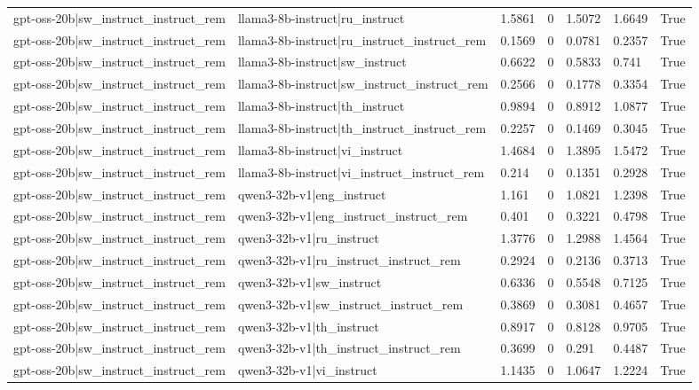 \begin{table}
\begin{tabular}{llllllr}
gpt-oss-20b|sw_instruct_instruct_rem & llama3-8b-instruct|ru_instruct & 1.5861 & 0 & 1.5072 & 1.6649 & True \\
gpt-oss-20b|sw_instruct_instruct_rem & llama3-8b-instruct|ru_instruct_instruct_rem & 0.1569 & 0 & 0.0781 & 0.2357 & True \\
gpt-oss-20b|sw_instruct_instruct_rem & llama3-8b-instruct|sw_instruct & 0.6622 & 0 & 0.5833 & 0.741 & True \\
gpt-oss-20b|sw_instruct_instruct_rem & llama3-8b-instruct|sw_instruct_instruct_rem & 0.2566 & 0 & 0.1778 & 0.3354 & True \\
gpt-oss-20b|sw_instruct_instruct_rem & llama3-8b-instruct|th_instruct & 0.9894 & 0 & 0.8912 & 1.0877 & True \\
gpt-oss-20b|sw_instruct_instruct_rem & llama3-8b-instruct|th_instruct_instruct_rem & 0.2257 & 0 & 0.1469 & 0.3045 & True \\
gpt-oss-20b|sw_instruct_instruct_rem & llama3-8b-instruct|vi_instruct & 1.4684 & 0 & 1.3895 & 1.5472 & True \\
gpt-oss-20b|sw_instruct_instruct_rem & llama3-8b-instruct|vi_instruct_instruct_rem & 0.214 & 0 & 0.1351 & 0.2928 & True \\
gpt-oss-20b|sw_instruct_instruct_rem & qwen3-32b-v1|eng_instruct & 1.161 & 0 & 1.0821 & 1.2398 & True \\
gpt-oss-20b|sw_instruct_instruct_rem & qwen3-32b-v1|eng_instruct_instruct_rem & 0.401 & 0 & 0.3221 & 0.4798 & True \\
gpt-oss-20b|sw_instruct_instruct_rem & qwen3-32b-v1|ru_instruct & 1.3776 & 0 & 1.2988 & 1.4564 & True \\
gpt-oss-20b|sw_instruct_instruct_rem & qwen3-32b-v1|ru_instruct_instruct_rem & 0.2924 & 0 & 0.2136 & 0.3713 & True \\
gpt-oss-20b|sw_instruct_instruct_rem & qwen3-32b-v1|sw_instruct & 0.6336 & 0 & 0.5548 & 0.7125 & True \\
gpt-oss-20b|sw_instruct_instruct_rem & qwen3-32b-v1|sw_instruct_instruct_rem & 0.3869 & 0 & 0.3081 & 0.4657 & True \\
gpt-oss-20b|sw_instruct_instruct_rem & qwen3-32b-v1|th_instruct & 0.8917 & 0 & 0.8128 & 0.9705 & True \\
gpt-oss-20b|sw_instruct_instruct_rem & qwen3-32b-v1|th_instruct_instruct_rem & 0.3699 & 0 & 0.291 & 0.4487 & True \\
gpt-oss-20b|sw_instruct_instruct_rem & qwen3-32b-v1|vi_instruct & 1.1435 & 0 & 1.0647 & 1.2224 & True \\

\end{tabular}
\end{table}
